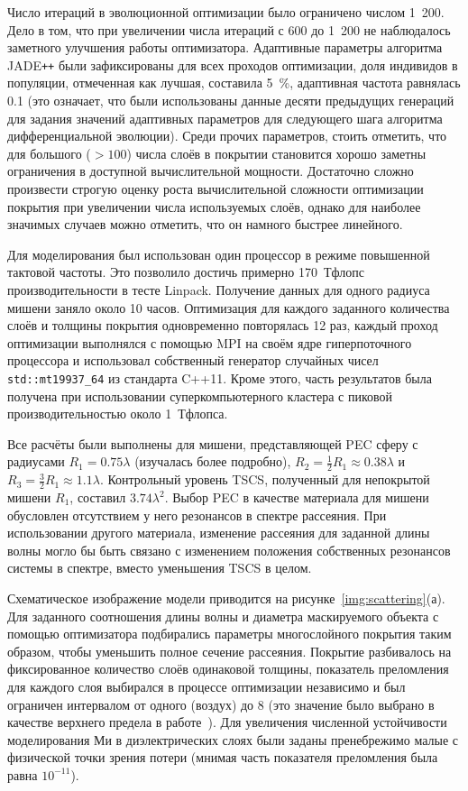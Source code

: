 Число итераций в эволюционной оптимизации было ограничено числом
1~200. Дело в том, что при увеличении числа итераций с 600 до 1~200 не
наблюдалось заметного улучшения работы оптимизатора. Адаптивные
параметры алгоритма JADE\texttt{++} были зафиксированы для всех проходов
оптимизации, доля индивидов в популяции, отмеченная как лучшая,
составила 5~\%, адаптивная частота равнялась 0.1 (это означает, что
были использованы данные десяти предыдущих генераций для задания
значений адаптивных параметров для следующего шага алгоритма
дифференциальной эволюции).  Среди прочих параметров, стоить отметить,
что для большого ($>100$) числа слоёв в покрытии становится хорошо
заметны ограничения в доступной вычислительной мощности. Достаточно
сложно произвести строгую оценку роста вычислительной сложности
оптимизации покрытия при увеличении числа используемых слоёв, однако
для наиболее значимых случаев можно отметить, что он намного быстрее
линейного.

Для моделирования был использован один процессор в режиме повышенной
тактовой частоты. Это позволило достичь примерно 170~Тфлопс
производительности в тесте Linpack. Получение данных для одного
радиуса мишени заняло около 10 часов. Оптимизация для каждого
заданного количества слоёв и толщины покрытия одновременно повторялась
12 раз, каждый проход оптимизации выполнялся с помощью MPI на своём
ядре гиперпоточного процессора и использовал собственный генератор
случайных чисел \verb+std::mt19937_64+ из стандарта C++11. Кроме
этого, часть результатов была получена при использовании
суперкомпьютерного кластера с пиковой производительностью около
1~Тфлопса.

Все расчёты были выполнены для мишени, представляющей PEC сферу с
радиусами ${R_1 = 0.75\lambda}$ (изучалась более подробно),
${R_2 = \frac{1}{2}R_1\approx 0.38\lambda}$ и
${R_3 = \frac{3}{2}R_1 \approx 1.1\lambda}$.  Контрольный уровень
TSCS, полученный для непокрытой мишени ${R_1}$, составил
$3.74\lambda^2$.  Выбор PEC в качестве материала для мишени обусловлен
отсутствием у него резонансов в спектре рассеяния. При использовании
другого материала, изменение рассеяния для заданной длины волны могло
бы быть связано с изменением положения собственных резонансов системы
в спектре, вместо уменьшения TSCS в целом.

Схематическое изображение модели приводится на
рисунке~\ref{img:scattering}(а). Для заданного соотношения длины волны
и диаметра маскируемого объекта с помощью оптимизатора подбирались
параметры многослойного покрытия таким образом, чтобы уменьшить полное
сечение рассеяния.  Покрытие разбивалось на фиксированное количество
слоёв одинаковой толщины, показатель преломления для каждого слоя
выбирался в процессе оптимизации независимо и был ограничен интервалом
от одного (воздух) до $8$ (это значение было выбрано в качестве
верхнего предела в работе~\cite{semouchkina2}).  Для увеличения
численной устойчивости моделирования Ми в диэлектрических слоях были
заданы пренебрежимо малые с физической точки зрения потери (мнимая
часть показателя преломления была равна $10^{-11}$).

